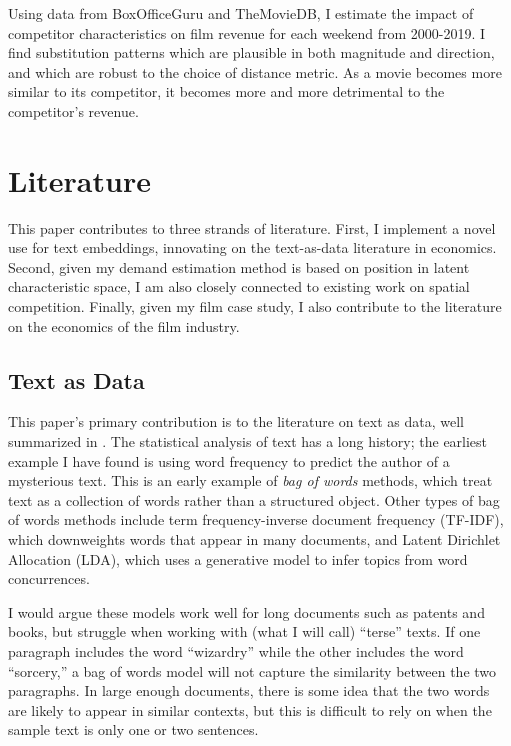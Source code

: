 \documentclass{article}
\begin{document}
Using data from BoxOfficeGuru and TheMovieDB, I estimate the impact of competitor characteristics on film revenue for each weekend from 2000-2019. I find substitution patterns which are plausible in both magnitude and direction, and which are robust to the choice of distance metric. As a movie becomes more similar to its competitor, it becomes more and more detrimental to the competitor's revenue. 

\section{Literature}

This paper contributes to three strands of literature. First, I implement a novel use for text embeddings, innovating on the text-as-data literature in economics. Second, given my demand estimation method is based on position in latent characteristic space, I am also closely connected to existing work on spatial competition. Finally, given my film case study, I also contribute to the literature on the economics of the film industry. 

\subsection{Text as Data}

This paper's primary contribution is to the literature on text as data, well summarized in \textcite{gentzkow2019EL}. The statistical analysis of text has a long history; the earliest example I have found is \textcite{mendenhall1887S} using word frequency to predict the author of a mysterious text. This is an early example of \emph{bag of words} methods, which treat text as a collection of words rather than a structured object. Other types of bag of words methods include term frequency-inverse document frequency (TF-IDF), which downweights words that appear in many documents, and Latent Dirichlet Allocation (LDA), which uses a generative model to infer topics from word concurrences.

I would argue these models work well for long documents such as patents and books, but struggle when working with (what I will call) ``terse'' texts. If one paragraph includes the word ``wizardry'' while the other includes the word ``sorcery,'' a bag of words model will not capture the similarity between the two paragraphs. In large enough documents, there is some idea that the two words are likely to appear in similar contexts, but this is difficult to rely on when the sample text is only one or two sentences. 
\end{document}
